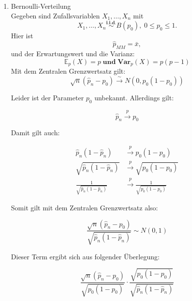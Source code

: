 \documentclass[10pt]{article}
\newcommand{\FZV}{X_1, \ldots, X_n} %
\newcommand{\EW}{\mathbb{E}} %
\newcommand{\KW}{\overset{p} \longrightarrow} %
\newcommand{\KV}{\overset{\sim} \longrightarrow} %
\begin{document}
	\begin{enumerate}[label = (\roman*)]
		\item Bernoulli-Verteilung\\
		Gegeben sind Zufallsvariablen $\FZV$ mit
		\begin{equation*}
			\FZV \overset{\textbf{i.i.d.}}{\sim} B(p_0), \; 0 \leq p_0 \leq 1.
		\end{equation*} 
		Hier ist
		\begin{equation*}
			\hat{p}_{MM} = \bar{x},
		\end{equation*}
		und der Erwartungswert und die Varianz:
		\begin{equation*}
			\EW_p(X)=p \; \textbf{und} \; 	\textbf{Var}_p(X) = p(p-1)
		\end{equation*}
		Mit dem Zentralen Grenzwertsatz gilt:
		\begin{equation*}
			\sqrt{n}(\hat{p}_n - p_0) \KV N(0,p_0(1-p_0))
		\end{equation*}
		
		Leider ist der Parameter $p_0$ unbekannt. Allerdings gilt:
		
		\begin{equation*}
			\hat{p}_n \KW p_0
		\end{equation*}
		
		Damit gilt auch:
		
		\begin{equation*}
			\begin{split}
				\hat{p}_n (1-\hat{p}_n) &\KW p_0(1-p_0) \\
				\sqrt{\hat{p}_n (1-\hat{p}_n)} &\KW \sqrt{p_0(1-p_0)} \\
				\frac{1}{\sqrt{\hat{p}_n (1-\hat{p}_n)}} &\KW \frac{1}{\sqrt{p_0(1-p_0)}}
			\end{split}
		\end{equation*}
		
		Somit gilt mit dem Zentralen Grenzwertsatz also:
		
		\begin{equation*}
			\frac{\sqrt{n} (\hat{p}_n - p_0)}{\sqrt{\hat{p}_n (1-\hat{p}_n)}} \sim N(0,1)
		\end{equation*}
		
		Dieser Term ergibt sich aus folgender Überlegung:
		
		\begin{equation*}
			\frac{\sqrt{n} (\hat{p}_n - p_0)}{\sqrt{p_0 (1-p_0)}} \cdot \frac{\sqrt{p_0(1-p_0)}}{\sqrt{\hat{p}_n (1-\hat{p}_n)}}
		\end{equation*}
		

\end{enumerate}
\end{document}
